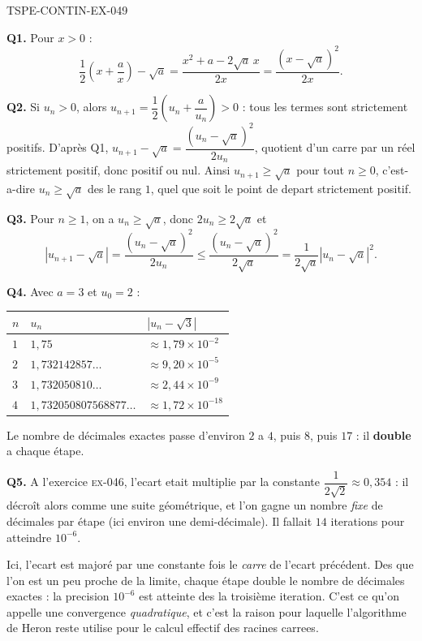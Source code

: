 \begin{corrige}{TSPE-CONTIN-EX-049}

\textbf{Q1.} Pour $x > 0$ :
\[ \frac{1}{2}\left(x + \frac{a}{x}\right) - \sqrt a = \frac{x^2 + a - 2\sqrt a\,x}{2x} = \frac{\left(x - \sqrt a\right)^2}{2x}. \]

\textbf{Q2.} Si $u_n > 0$, alors $u_{n+1} = \dfrac{1}{2}\left(u_n + \dfrac{a}{u_n}\right) > 0$ : tous les termes sont strictement positifs. D'après Q1, $u_{n+1} - \sqrt a = \dfrac{\left(u_n - \sqrt a\right)^2}{2u_n}$, quotient d'un carre par un réel strictement positif, donc positif ou nul. Ainsi $u_{n+1} \geq \sqrt a$ pour tout $n \geq 0$, c'est-a-dire $u_n \geq \sqrt a$ des le rang $1$, quel que soit le point de depart strictement positif.

\textbf{Q3.} Pour $n \geq 1$, on a $u_n \geq \sqrt a$, donc $2u_n \geq 2\sqrt a$ et
\[ \left|u_{n+1} - \sqrt a\right| = \frac{\left(u_n - \sqrt a\right)^2}{2u_n} \leq \frac{\left(u_n - \sqrt a\right)^2}{2\sqrt a} = \frac{1}{2\sqrt a}\left|u_n - \sqrt a\right|^2. \]

\textbf{Q4.} Avec $a = 3$ et $u_0 = 2$ :
\begin{center}
\begin{tabular}{lll}
\hline
$n$ & $u_n$ & $\left|u_n - \sqrt3\right|$ \\
\hline
$1$ & $1{,}75$ & $\approx 1{,}79 \times 10^{-2}$ \\
$2$ & $1{,}732142857\dots$ & $\approx 9{,}20 \times 10^{-5}$ \\
$3$ & $1{,}732050810\dots$ & $\approx 2{,}44 \times 10^{-9}$ \\
$4$ & $1{,}732050807568877\dots$ & $\approx 1{,}72 \times 10^{-18}$ \\
\hline
\end{tabular}
\end{center}
Le nombre de décimales exactes passe d'environ $2$ a $4$, puis $8$, puis $17$ : il \textbf{double} a chaque étape.

\textbf{Q5.} A l'exercice \textsc{ex-046}, l'ecart etait multiplie par la constante $\dfrac{1}{2\sqrt2} \approx 0{,}354$ : il décroît alors comme une suite géométrique, et l'on gagne un nombre \emph{fixe} de décimales par étape (ici environ une demi-décimale). Il fallait $14$ iterations pour atteindre $10^{-6}$.

Ici, l'ecart est majoré par une constante fois le \emph{carre} de l'ecart précédent. Des que l'on est un peu proche de la limite, chaque étape double le nombre de décimales exactes : la precision $10^{-6}$ est atteinte des la troisième iteration. C'est ce qu'on appelle une convergence \emph{quadratique}, et c'est la raison pour laquelle l'algorithme de Heron reste utilise pour le calcul effectif des racines carrees.
\end{corrige}
